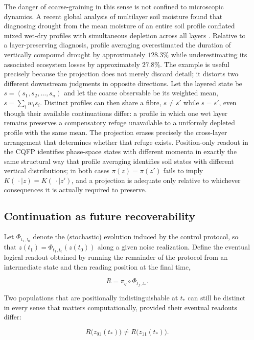 \documentclass[11pt]{article}
\begin{document}
The danger of coarse-graining in this sense is not confined to microscopic dynamics. A recent global analysis of multilayer soil moisture found that diagnosing drought from the mean moisture of an entire soil profile conflated mixed wet-dry profiles with simultaneous depletion across all layers \cite{GuEtAl2026}. Relative to a layer-preserving diagnosis, profile averaging overestimated the duration of vertically compound drought by approximately $128.3\%$ while underestimating its associated ecosystem losses by approximately $27.8\%$. The example is useful precisely because the projection does not merely discard detail; it distorts two different downstream judgments in opposite directions. Let the layered state be $s=(s_1,s_2,\ldots,s_n)$ and let the coarse observable be its weighted mean, $\bar s=\sum_i w_i s_i$. Distinct profiles can then share a fibre, $s\neq s'$ while $\bar s=\bar s'$, even though their available continuations differ: a profile in which one wet layer remains preserves a compensatory refuge unavailable to a uniformly depleted profile with the same mean. The projection erases precisely the cross-layer arrangement that determines whether that refuge exists. Position-only readout in the CQFP identifies phase-space states with different momenta in exactly the same structural way that profile averaging identifies soil states with different vertical distributions; in both cases $\pi(z)=\pi(z')$ fails to imply $K(\,\cdot\mid z)=K(\,\cdot\mid z')$, and a projection is adequate only relative to whichever consequences it is actually required to preserve.

\subsection{Continuation as future recoverability}

Let $\Phi_{t_1,t_0}$ denote the (stochastic) evolution induced by the control protocol, so that $z(t_1)=\Phi_{t_1,t_0}(z(t_0))$ along a given noise realization. Define the eventual logical readout obtained by running the remainder of the protocol from an intermediate state and then reading position at the final time,

\[
R = \pi_q\circ\Phi_{t_f,t_\ast}.
\]

Two populations that are positionally indistinguishable at $t_\ast$ can still be distinct in every sense that matters computationally, provided their eventual readouts differ:

\[
R\bigl(z_{01}(t_\ast)\bigr)\neq R\bigl(z_{11}(t_\ast)\bigr).
\]
\end{document}
